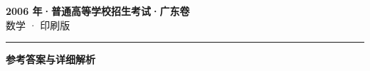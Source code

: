 \documentclass[zihao=5, a4paper]{ctexart}
\begin{document}
\begin{center}
  {\Large\bfseries 2006 年·普通高等学校招生考试·广东卷}\\[4pt]
  {\large 数学 · 印刷版}
\end{center}
\medskip
{}

\par\bigskip\hrule\bigskip
{}
\begin{center}{\large\bfseries 参考答案与详细解析}\end{center}
\smallskip

\end{document}
